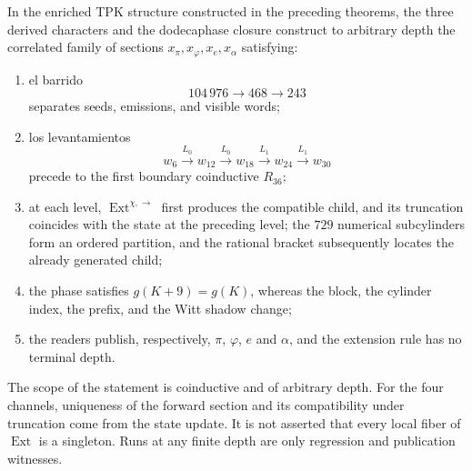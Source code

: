 \begin{theorem}
\label{thm:generacion-monodromica-conjunta-rev7}
In the enriched TPK structure constructed in the preceding theorems, the
three derived characters and the dodecaphase closure construct to arbitrary
depth the correlated family of sections
\(x_\pi,x_\varphi,x_e,x_\alpha\) satisfying:
\begin{enumerate}
 \item el barrido
 \[
 104\,976\longrightarrow468\longrightarrow243
 \]
 separates seeds, emissions, and visible words;
 \item los levantamientos
 \[
 w_6\xrightarrow{L_0}w_{12}\xrightarrow{L_0}w_{18}
 \xrightarrow{L_1}w_{24}\xrightarrow{L_1}w_{30}
 \]
 precede to the first boundary coinductive \(R_{36}\);
 \item at each level,
 \(\operatorname{Ext}^{\chi,\rightarrow}\) first produces the compatible
 child, and its truncation coincides with the state at the preceding level; the
 \(729\) numerical subcylinders form an ordered partition, and the rational
 bracket subsequently locates the already generated child;
 \item the phase satisfies \(g(K+9)=g(K)\), whereas the block, the cylinder
 index, the prefix, and the Witt shadow change;
 \item the readers publish, respectively, \(\pi\), \(\varphi\), \(e\)
 and \(\alpha\), and the extension rule has no terminal depth.
\end{enumerate}
\end{theorem}

The scope of the statement is coinductive and of arbitrary depth. For the
four channels, uniqueness of the forward section and its compatibility under
truncation come from the state update. It is not asserted that every
local fiber of \(\operatorname{Ext}\) is a singleton. Runs at any
finite depth are only regression and publication witnesses.

